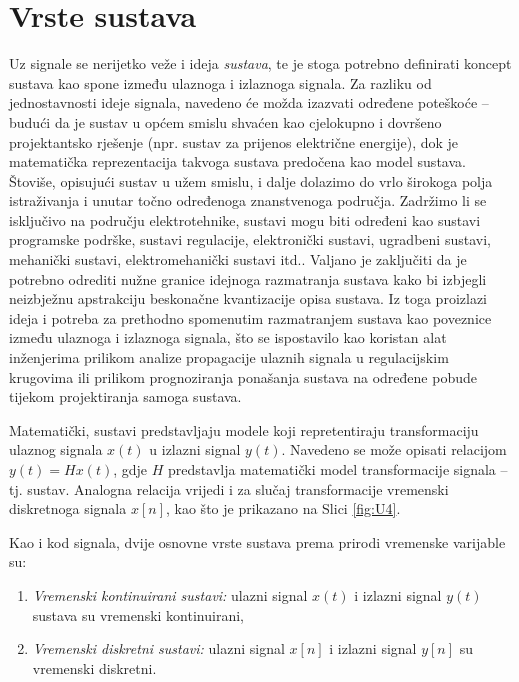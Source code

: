 \documentclass[a4paper,12pt,oneside]{memoir}
\begin{document}
        \section{Vrste sustava}
            Uz signale se nerijetko veže i ideja \textit{sustava}, te je stoga potrebno definirati koncept sustava kao spone između ulaznoga i izlaznoga signala. Za razliku od jednostavnosti ideje signala, navedeno će možda izazvati određene poteškoće -- budući da je sustav u općem smislu shvaćen kao cjelokupno i dovršeno projektantsko rješenje (npr. sustav za prijenos električne energije), dok je matematička reprezentacija takvoga sustava predočena kao model sustava. Štoviše, opisujući sustav u užem smislu, i dalje dolazimo do vrlo širokoga polja istraživanja i unutar točno određenoga znanstvenoga područja. Zadržimo li se isključivo na području elektrotehnike, sustavi mogu biti određeni kao sustavi programske podrške, sustavi regulacije, elektronički sustavi, ugradbeni sustavi, mehanički sustavi, elektromehanički sustavi itd.. Valjano je zaključiti da je potrebno odrediti nužne granice idejnoga razmatranja sustava kako bi izbjegli neizbježnu apstrakciju beskonačne kvantizacije opisa sustava. Iz toga proizlazi ideja i potreba za prethodno spomenutim razmatranjem sustava kao poveznice između ulaznoga i izlaznoga signala, što se ispostavilo kao koristan alat inženjerima prilikom analize propagacije ulaznih signala u regulacijskim krugovima ili prilikom prognoziranja ponašanja sustava na određene pobude tijekom projektiranja samoga sustava.

            Matematički, sustavi predstavljaju modele koji repretentiraju transformaciju ulaznog signala $x(t)$ u izlazni signal $y(t)$. Navedeno se može opisati relacijom $y(t)=Hx(t)$, gdje $H$ predstavlja matematički model transformacije signala -- tj. sustav. Analogna relacija vrijedi i za slučaj transformacije vremenski diskretnoga signala $x[n]$, kao što je prikazano na Slici \ref{fig:U4}.
            
            Kao i kod signala, dvije osnovne vrste sustava prema prirodi vremenske varijable su:
            \begin{enumerate}
                \item \textit{Vremenski kontinuirani sustavi:} ulazni signal $x(t)$ i izlazni signal $y(t)$ sustava su vremenski kontinuirani,
                \item \textit{Vremenski diskretni sustavi:} ulazni signal $x[n]$ i izlazni signal $y[n]$ su vremenski diskretni.
            \end{enumerate}
\end{document}

